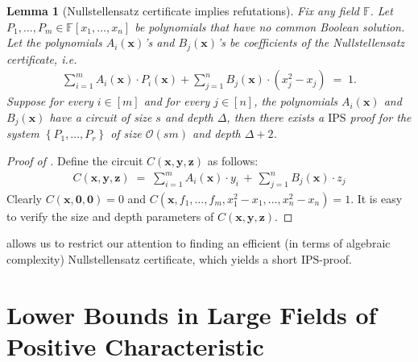 \documentclass[11pt]{article}
\newtheorem{lemma}[theorem]{Lemma}
\newcommand{\bigO}{\mathcal{O}}
\newcommand{\set}[1]{\left\{ #1 \right\}}
\newcommand{\F}{\mathbb{F}}
\newcommand{\IPS}{\mathrm{IPS}}
\begin{document}
\begin{lemma}[Nullstellensatz certificate implies refutations]\label{lemma:nullstellensatz-refutations}
Fix any field $\F$. Let $P_{1},\ldots,P_{m} \in \F[x_{1},\ldots,x_{n}]$ be polynomials that have no common Boolean solution. Let the polynomials $A_{i}(\mathbf{x})$'s and $B_{j}(\mathbf{x})$'s be coefficients of the Nullstellensatz certificate, i.e.
\begin{align*}
    \sum_{i=1}^{m} A_{i}(\mathbf{x}) \cdot P_{i}(\mathbf{x}) + \sum_{j=1}^{n} B_{j}(\mathbf{x}) \cdot (x_{j}^{2} - x_{j}) \; = \; 1.
\end{align*}
Suppose for every $i \in [m]$ and for every $j \in [n]$, the polynomials $A_{i}(\mathbf{x})$ and $B_{j}(\mathbf{x})$ have a circuit of size $s$ and depth $\Delta$, then there exists a $\IPS$ proof for the system $\set{P_{1},\ldots,P_{r}}$ of size $\bigO(sm)$ and depth $\Delta+2$.
\end{lemma}
\begin{proof}[Proof of ]
Define the circuit $C(\mathbf{x}, \mathbf{y}, \mathbf{z})$ as follows:
\begin{align*}
    C(\mathbf{x}, \mathbf{y}, \mathbf{z}) \; = \; \sum_{i=1}^{m} A_{i}(\mathbf{x}) \cdot y_{i} \, + \, \sum_{j=1}^{n} B_{j}(\mathbf{x}) \cdot z_{j}
\end{align*}
Clearly $C(\mathbf{x}, \mathbf{0}, \mathbf{0}) = 0$ and $C(\mathbf{x}, f_{1},\ldots,f_{m}, x_{1}^{2}-x_{1},\ldots,x_{n}^{2}-x_{n}) = 1$. It is easy to verify the size and depth parameters of $C(\mathbf{x}, \mathbf{y}, \mathbf{z})$.
\end{proof} 
 allows us to restrict our attention to finding an efficient (in terms of algebraic complexity) Nullstellensatz certificate, which yields a short $\IPS$-proof.




\newcommand{\Coeff}{\ensuremath{\operatorname{Coeff}}}
\newcommand{\bfCoeff}{\ensuremath{\operatorname{\mathbf{Coeff}}}}
\newcommand{\Eval}{\ensuremath{\operatorname{Eval}}}
\newcommand{\bfEval}{\ensuremath{\operatorname{\mathbf{Eval}}}}
\newcommand{\bfalpha}{\ensuremath{\boldsymbol{\alpha}}}
\newcommand{\bfw}{\ensuremath{\mathbf{w}}}
\newcommand{\Aw}{\ensuremath{A_\bfw}}
\newcommand{\Bw}{\ensuremath{B_\bfw}}
\renewcommand{\char}{\ensuremath{\operatorname{char}}}
\newcommand{\bbF}{\ensuremath{\F}}
\newcommand{\ksw}{\ensuremath{\operatorname{ks}_{\bfw}}}
\newcommand{\kswnew}[1]{\ensuremath{\operatorname{ks}_{\bfw,#1}}}
\section{Lower Bounds in Large Fields of Positive Characteristic}
\end{document}
